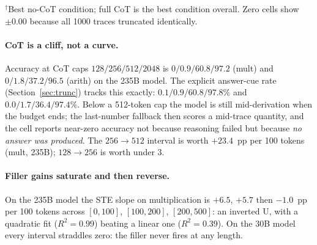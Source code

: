\documentclass[11pt,a4paper]{article}
\begin{document}
\begin{table}[h]
\centering
\caption{The recovery grid: accuracy (\%) $\pm$ 95\% CI, 0-shot,
$N{=}1000$ per cell. Bold marks the best condition per row.}
\label{tab:grid}
\smallskip
{\footnotesize $^{\dagger}$Best no-CoT condition; full CoT is the best
condition overall. Zero cells show $\pm 0.00$ because all 1000 traces
truncated identically.}
\end{table}

\paragraph{CoT is a cliff, not a curve.}
Accuracy at CoT caps $128/256/512/2048$ is
$0/0.9/60.8/97.2$ (mult) and $0/1.8/37.2/96.5$ (arith) on the 235B model.
The explicit answer-cue rate (Section~\ref{sec:trunc}) tracks this exactly:
$0.1/0.9/60.8/97.8\%$ and $0.0/1.7/36.4/97.4\%$. Below a 512-token cap the
model is still mid-derivation when the budget ends; the last-number fallback
then scores a mid-trace quantity, and the cell reports near-zero accuracy not
because reasoning failed but because \emph{no answer was produced}. The
$256{\to}512$ interval is worth $+23.4$~pp per 100 tokens (mult, 235B);
$128{\to}256$ is worth under $3$.

\paragraph{Filler gains saturate and then reverse.}
On the 235B model the STE slope on multiplication is $+6.5$, $+5.7$ then
$-1.0$~pp per 100 tokens across $[0,100]$, $[100,200]$, $[200,500]$: an
inverted U, with a quadratic fit ($R^2 = 0.99$) beating a linear one
($R^2 = 0.39$). On the 30B model every interval straddles zero: the filler
never fires at any length.
\end{document}
